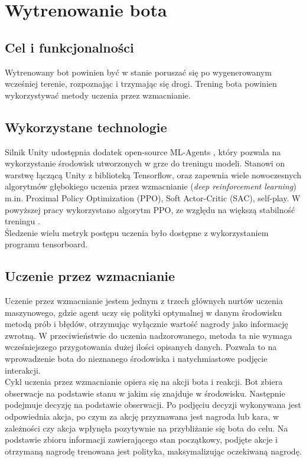 \chapter{Wytrenowanie bota}
\thispagestyle{chapterBeginStyle}

\section{Cel i funkcjonalności}
Wytrenowany bot powinien być w stanie poruszać się po wygenerowanym wcześniej terenie, rozpoznając i trzymając się drogi. Trening bota powinien wykorzystywać metody uczenia przez wzmacnianie.

\section{Wykorzystane technologie}
Silnik Unity udostępnia dodatek open-source ML-Agents \cite{UnityMlAgentsRepository} \cite{UnityMlAgents}, który pozwala na wykorzystanie środowisk utworzonych w grze do treningu modeli. Stanowi on warstwę łączącą Unity z biblioteką Tensorflow, oraz zapewnia wiele nowoczesnych algorytmów głębokiego uczenia przez wzmacnianie (\textit{deep reinforcement learning}) m.in. Proximal Policy Optimization (PPO), Soft Actor-Critic (SAC), self-play. W powyższej pracy wykorzystano algorytm PPO, ze względu na większą stabilność treningu \cite{CompareDrlAlgorithms}. \\
Śledzenie wielu metryk postępu uczenia było dostępne z wykorzystaniem programu tensorboard.

\section{Uczenie przez wzmacnianie}
Uczenie przez wzmacnianie jestem jednym z trzech głównych nurtów uczenia maszynowego, gdzie agent uczy się polityki optymalnej w danym środowisku metodą prób i błędów, otrzymując wyłącznie wartość nagrody jako informację zwrotną. W przeciwieństwie do uczenia nadzorowanego, metoda ta nie wymaga wcześniejszego przygotowania dużej ilości opisanych danych. Pozwala to na wprowadzenie bota do nieznanego środowiska i natychmiastowe podjęcie interakcji.\\
Cykl uczenia przez wzmacnianie opiera się na akcji bota i reakcji. Bot zbiera obserwacje na podstawie stanu w jakim się znajduje w środowisku. Następnie podejmuje decyzję na podstawie obserwacji. Po podjęciu decyzji wykonywana jest odpowiednia akcja, po czym za akcję przyznawana jest nagroda lub kara, w zależności czy akcja wpłynęła pozytywnie na przybliżanie się bota do celu. Na podstawie zbioru informacji zawierającego stan początkowy, podjęte akcje i otrzymaną nagrodę trenowana jest polityka, maksymalizując oczekiwaną nagrodę.
\clearpage
